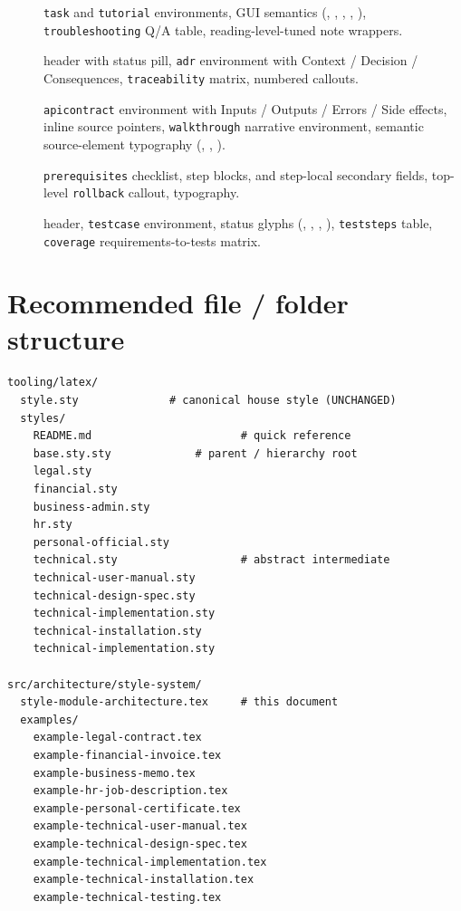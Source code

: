 \documentclass[11pt]{article}
\begin{document}
\begin{description}
  \item[] \texttt{task} and \texttt{tutorial}
    environments, GUI semantics (, ,
    , , ),
    \texttt{troubleshooting} Q/A table, reading-level-tuned note wrappers.
  \item[]  header with status
    pill, \texttt{adr} environment with Context / Decision / Consequences,
    \texttt{traceability} matrix, numbered 
    callouts.
  \item[] \texttt{apicontract} environment
    with Inputs / Outputs / Errors / Side effects, 
    inline source pointers, \texttt{walkthrough} narrative environment,
    semantic source-element typography (,
    , ).
  \item[] \texttt{prerequisites} checklist,
     step blocks,  and
     step-local secondary fields, top-level
    \texttt{rollback} callout,  typography.
  \item[]  header,
    \texttt{testcase} environment, status glyphs (,
    , , ),
    \texttt{teststeps} table, \texttt{coverage} requirements-to-tests
    matrix.
\end{description}

\section{Recommended file / folder structure}

\begin{verbatim}
tooling/latex/
  style.sty              # canonical house style (UNCHANGED)
  styles/
    README.md                       # quick reference
    base.sty.sty             # parent / hierarchy root
    legal.sty
    financial.sty
    business-admin.sty
    hr.sty
    personal-official.sty
    technical.sty                   # abstract intermediate
    technical-user-manual.sty
    technical-design-spec.sty
    technical-implementation.sty
    technical-installation.sty
    technical-implementation.sty

src/architecture/style-system/
  style-module-architecture.tex     # this document
  examples/
    example-legal-contract.tex
    example-financial-invoice.tex
    example-business-memo.tex
    example-hr-job-description.tex
    example-personal-certificate.tex
    example-technical-user-manual.tex
    example-technical-design-spec.tex
    example-technical-implementation.tex
    example-technical-installation.tex
    example-technical-testing.tex
\end{verbatim}
\end{document}
